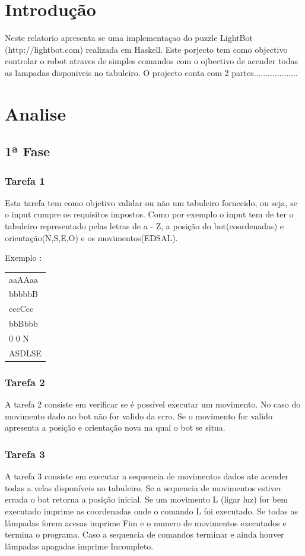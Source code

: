 \documentclass{report}
\begin{document}
\tableofcontents



\chapter{Introdução}
Neste relatorio apresenta se uma implementaçao do puzzle LightBot (http://lightbot.com) realizada em Haskell.
Este porjecto tem como objectivo controlar o robot atraves de simples comandos com o ojbectivo de acender todas as lampadas disponiveis no tabuleiro.
O projecto conta com 2 partes...................
\chapter{Analise}

\section{1ª Fase}
\subsection{Tarefa 1} 
Esta tarefa tem como objetivo validar ou não um tabuleiro fornecido, ou seja, se o input cumpre os requisitos impostos. Como por exemplo o input tem de ter o tabuleiro representado pelas letras de a - Z, a posição do bot(coordenadas) e orientação(N,S,E,O) e os movimentos(EDSAL).   

Exemplo :
\begin{tabular}[l]{l}
   aaAAaa\\
   bbbbbB\\
   cccCcc\\
   bbBbbb\\
   0 0 N\\
   ASDLSE

\end{tabular}



\subsection{Tarefa 2} 
A tarefa 2 consiste em verificar se é possível executar um movimento. No caso do movimento dado ao bot não for valido da erro. Se o movimento for valido apresenta a posição e orientação nova na qual o bot se situa. 
 
 
\subsection{Tarefa 3} 
A tarefa 3 consiste em executar a sequencia de movimentos dados ate acender todas a velas disponíveis no tabuleiro. Se a sequencia de movimentos estiver errada o bot retorna a posição inicial. Se um movimento L (ligar luz) for bem executado imprime as coordenadas onde o comando L foi executado. Se todas as lâmpadas forem acesas imprime Fim e o numero de movimentos executados e termina o programa. Caso a sequencia de comandos terminar e ainda houver lâmpadas apagadas imprime Incompleto.  
 
\end{document}
